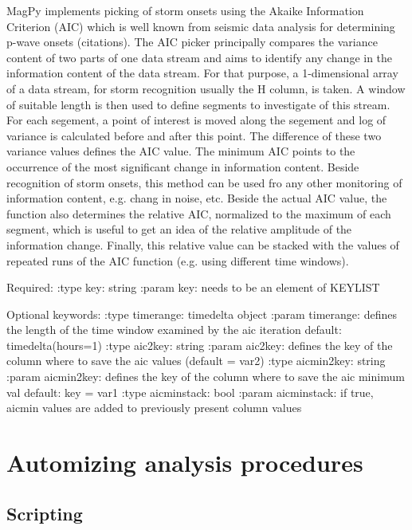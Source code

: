 MagPy implements picking of storm onsets using the Akaike Information Criterion (AIC) which is well known from seismic data analysis for determining p-wave onsets (citations).
The AIC picker principally compares the variance content of two parts of one data stream and aims to identify any change in the information content of the data stream. For that purpose, a 1-dimensional array of a data stream, for storm recognition usually the H column, is taken. A window of suitable length is then used to define segments to investigate of this stream. For each segement, a point of interest is moved along the segement and log of variance is calculated before and after this point. The difference of these two variance values defines the AIC value. The minimum AIC points to the occurrence of the most significant change in information content. Beside recognition of storm onsets, this method can be used fro any other monitoring of information content, e.g. chang in noise, etc. Beside the actual AIC value, the function also determines the relative AIC, normalized to the maximum of each segment, which is useful to get an idea of the relative amplitude of the information change. Finally, this relative value can be stacked with the values of repeated runs of the AIC function (e.g. using different time windows).

        Required:
        :type key: string
        :param key: needs to be an element of KEYLIST

        Optional keywords:
        :type timerange: timedelta object
        :param timerange: defines the length of the time window examined by the aic iteration
                        default: timedelta(hours=1)
        :type aic2key: string 
        :param aic2key: defines the key of the column where to save the aic values (default = var2)
        :type aicmin2key: string
        :param aicmin2key: defines the key of the column where to save the aic minimum val
                        default: key = var1
        :type aicminstack: bool
        :param aicminstack: if true, aicmin values are added to previously present column values

\section{Automizing analysis procedures}

\subsection{Scripting}

